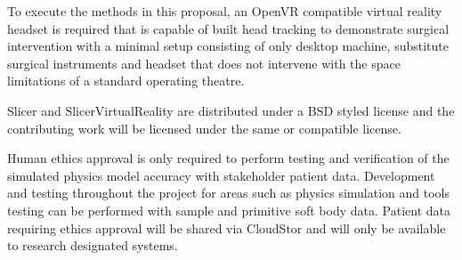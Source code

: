 
To execute the methods in this proposal, an OpenVR compatible virtual reality headset is required that is capable of built head tracking to demonstrate surgical intervention with a minimal setup consisting of only desktop machine, substitute surgical instruments and headset that does not intervene with the space limitations of a standard operating theatre.

Slicer and SlicerVirtualReality are distributed under a BSD styled license and the contributing work will be licensed under the same or compatible license.

Human ethics approval is only required to perform testing and verification of the simulated physics model accuracy with stakeholder patient data. Development and testing throughout the project for areas such as physics simulation and tools testing can be performed with sample and primitive soft body data. Patient data requiring ethics approval will be shared via CloudStor and will only be available to research designated systems.

